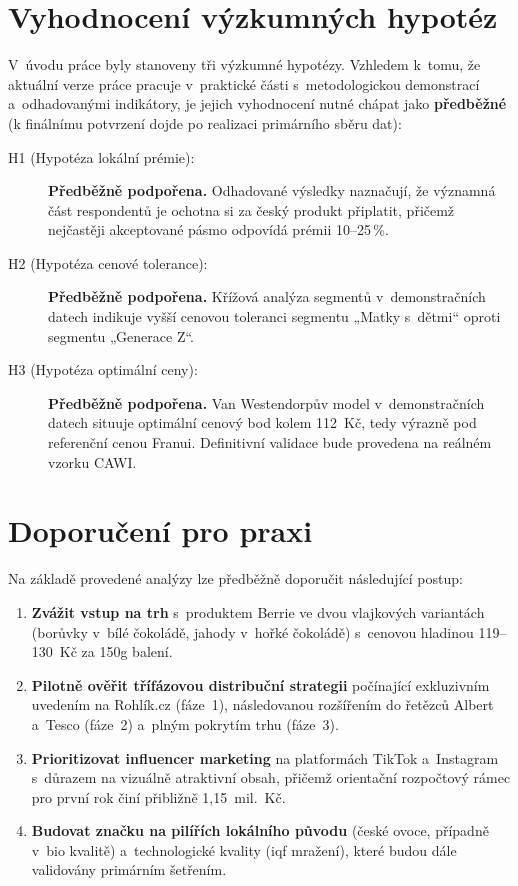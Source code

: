 \section{Vyhodnocení výzkumných hypotéz}
\label{sec:conclusion_hypotheses}

V~úvodu práce byly stanoveny tři výzkumné hypotézy. Vzhledem k~tomu, že aktuální verze práce pracuje v~praktické části s~metodologickou demonstrací a~odhadovanými indikátory, je jejich vyhodnocení nutné chápat jako \textbf{předběžné} (k finálnímu potvrzení dojde po realizaci primárního sběru dat):

\begin{description}
  \item[H1 (Hypotéza lokální prémie):] \textbf{Předběžně podpořena.} Odhadované výsledky naznačují, že významná část respondentů je ochotna si za český produkt připlatit, přičemž nejčastěji akceptované pásmo odpovídá prémii 10--25\,\%.
  \item[H2 (Hypotéza cenové tolerance):] \textbf{Předběžně podpořena.} Křížová analýza segmentů v~demonstračních datech indikuje vyšší cenovou toleranci segmentu „Matky s~dětmi“ oproti segmentu „Generace Z“.
  \item[H3 (Hypotéza optimální ceny):] \textbf{Předběžně podpořena.} Van Westendorpův model v~demonstračních datech situuje optimální cenový bod kolem 112~Kč, tedy výrazně pod referenční cenou Franui. Definitivní validace bude provedena na reálném vzorku CAWI.
\end{description}

\section{Doporučení pro praxi}

Na základě provedené analýzy lze předběžně doporučit následující postup:

\begin{enumerate}
  \item \textbf{Zvážit vstup na trh} s~produktem Berrie ve dvou vlajkových variantách (borůvky v~bílé čokoládě, jahody v~hořké čokoládě) s~cenovou hladinou 119--130~Kč za 150g balení.
  \item \textbf{Pilotně ověřit třífázovou distribuční strategii} počínající exkluzivním uvedením na Rohlík.cz (fáze~1), následovanou rozšířením do řetězců Albert a~Tesco (fáze~2) a~plným pokrytím trhu (fáze~3).
  \item \textbf{Prioritizovat influencer marketing} na platformách TikTok a~Instagram s~důrazem na vizuálně atraktivní obsah, přičemž orientační rozpočtový rámec pro první rok činí přibližně 1,15~mil.~Kč.
  \item \textbf{Budovat značku na pilířích lokálního původu} (české ovoce, případně v~\gls{bio} kvalitě) a~technologické kvality (\gls{iqf} mražení), které budou dále validovány primárním šetřením.
\end{enumerate}

